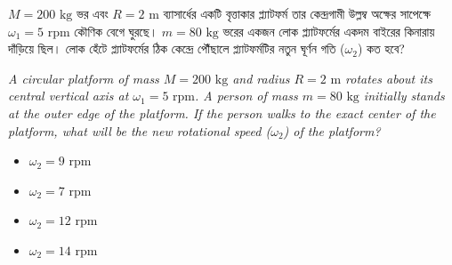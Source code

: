 \documentclass[12pt, a4paper]{article}
\begin{document}
\newpage
\begin{tcolorbox}[questionbox={প্রশ্ন (Question) 46}]
\noindent
$M = 200\text{ kg}$ ভর এবং $R = 2\text{ m}$ ব্যাসার্ধের একটি বৃত্তাকার প্ল্যাটফর্ম তার কেন্দ্রগামী উল্লম্ব অক্ষের সাপেক্ষে $\omega_1 = 5\text{ rpm}$ কৌণিক বেগে ঘুরছে। $m = 80\text{ kg}$ ভরের একজন লোক প্ল্যাটফর্মের একদম বাইরের কিনারায় দাঁড়িয়ে ছিল। লোক হেঁটে প্ল্যাটফর্মের ঠিক কেন্দ্রে পৌঁছালে প্ল্যাটফর্মটির নতুন ঘূর্ণন গতি ($\omega_2$) কত হবে?

\vspace{0.8em}
\begin{english}
\noindent\textit{\color{darkgray}
A circular platform of mass $M = 200\text{ kg}$ and radius $R = 2\text{ m}$ rotates about its central vertical axis at $\omega_1 = 5\text{ rpm}$. A person of mass $m = 80\text{ kg}$ initially stands at the outer edge of the platform. If the person walks to the exact center of the platform, what will be the new rotational speed ($\omega_2$) of the platform?
}
\end{english}
\end{tcolorbox}

\vspace{1em}
\begin{center}
\end{center}
\vspace{1em}

\begin{itemize}[label={}, leftmargin=1cm, itemsep=0.5em]
\item[\textbf{A)}] $\omega_2 = 9\text{ rpm}$
\item[\textbf{B)}] $\omega_2 = 7\text{ rpm}$
\item[\textbf{C)}] $\omega_2 = 12\text{ rpm}$
\item[\textbf{D)}] $\omega_2 = 14\text{ rpm}$
\end{itemize}
\end{document}
